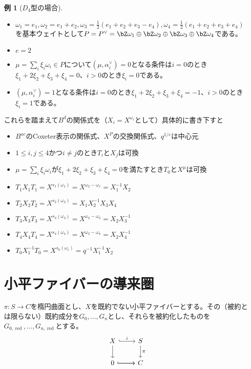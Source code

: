 \documentclass[uplatex, a4paper, dvipdfmx]{jsarticle}
\theoremstyle{definition}
\newtheorem{example}[theorem]{例}
\DeclareMathOperator{\red}{\mathrm{red}}
\begin{document}
\begin{example}[$D_4$型の場合]
    \begin{itemize}
        \item $\omega_1 = e_1, \omega_2 = e_1 + e_2, \omega_3 = \frac{1}{2}(e_1 + e_2 + e_3 - e_4), \omega_4 = \frac{1}{2}(e_1 + e_2 + e_3 + e_4)$を基本ウェイトとして$P = P^\vee = \bZ \omega_1 \oplus \bZ \omega_2 \oplus \bZ \omega_3 \oplus \bZ \omega_4$である。
        \item $e = 2$
        \item $\mu = \sum_i \xi_i \omega_i \in P$について$(\mu, \alpha_i^\vee) = 0$となる条件は$i=0$のとき$\xi_1 + 2\xi_2 + \xi_3 + \xi_4 = 0$、$i > 0$のとき$\xi_i = 0$である。
        \item $(\mu, \alpha_i^\vee) = 1$となる条件は$i=0$のとき$\xi_1 + 2\xi_2 + \xi_3 + \xi_4 = -1$、$i > 0$のとき$\xi_i = 1$である。
    \end{itemize}
    これらを踏まえて$B^d$の関係式を（$X_i = X^{\omega_i}$として）具体的に書き下すと
    \begin{itemize}
        \item $B^{ae}$のCoxeter表示の関係式、$X^P$の交換関係式、$q^{1/e}$は中心元
        \item $1\leq i, j \leq 4$かつ$i \neq j$のとき$T_i$と$X_j$は可換
        \item $\mu = \sum_i \xi_i \omega_i$が$\xi_1 + 2\xi_2 + \xi_3 + \xi_4 = 0$を満たすとき$T_0$と$X^\mu$は可換
        \item $T_1X_1T_1 = X^{s_1(\omega_1)} = X^{\omega_2-\omega_1} = X_1^{-1}X_2$
        \item $T_2X_2T_2 = X^{s_2(\omega_2)} = X_1X_2^{-1}X_3X_4$
        \item $T_3X_3T_3 = X^{s_3(\omega_3)} = X^{\omega_2-\omega_3} = X_2X_3^{-1}$
        \item $T_4X_4T_4 = X^{s_4(\omega_4)} = X^{\omega_2-\omega_4} = X_2X_4^{-1}$
        \item $T_0X_1^{-1}T_0 = X^{s_0(\omega_1)} = q^{-1}X_1^{-1}X_2$
    \end{itemize}
\end{example}
\section{小平ファイバーの導来圏}
$\pi \colon S \to C$を楕円曲面とし、$X$を既約でない小平ファイバーとする。その（被約とは限らない）既約成分を$G_0, \dots, G_n$とし、それらを被約化したものを$G_{0, \red}, \dots, G_{n, \red}$とする。
\[
    \begin{tikzcd}
        X \ar[r, hookrightarrow, "i"] \ar[d] & S \ar[d, "\pi"] \\
        0 \ar[r, hookrightarrow] \ar[r] & C
    \end{tikzcd}
\]
\end{document}
